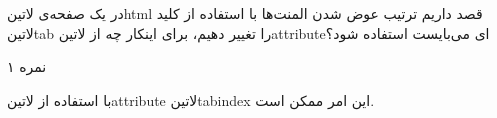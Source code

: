 \documentclass[../main.tex]{subfiles}
\begin{document}

در یک صفحه‌ی ‌لاتین{html} قصد داریم ترتیب عوض شدن المنت‌ها با استفاده از کلید ‌لاتین{tab} را تغییر دهیم، برای اینکار چه از ‌لاتین{attribute}ای می‌بایست استفاده شود؟

۱ نمره

\begin{answer}

با استفاده از ‌لاتین{attribute} ‌لاتین{tabindex} این امر ممکن است.

\end{answer}
\end{document}
